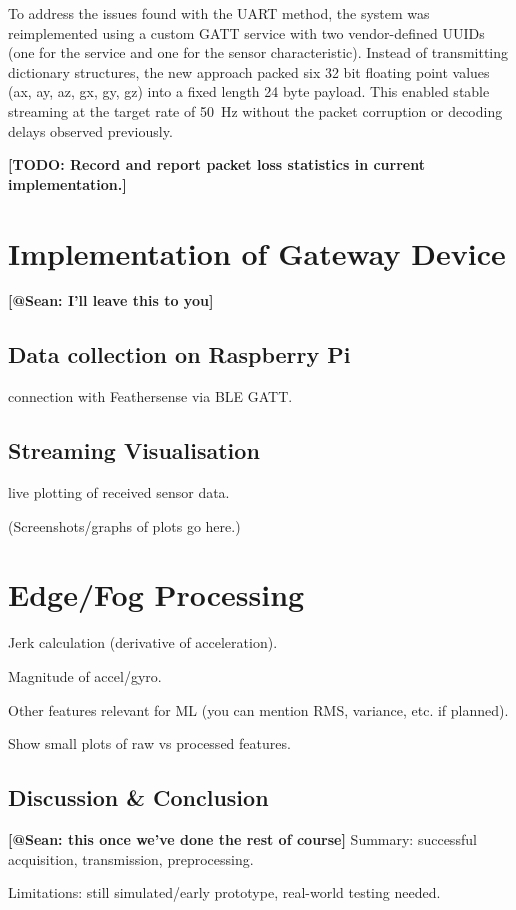 \documentclass[conference]{lib/IEEEtran}
\begin{document}
To address the issues found with the UART method, the system was reimplemented using a custom GATT service with two vendor-defined UUIDs (one for the service and one for the sensor characteristic). Instead of transmitting dictionary structures, the new approach packed six 32 bit floating point values (ax, ay, az, gx, gy, gz) into a fixed length 24 byte payload. This enabled stable streaming at the target rate of 50~Hz without the packet corruption or decoding delays observed previously.

\textbf{[TODO: Record and report packet loss statistics in current implementation.]} 




\section{Implementation of Gateway Device}
\textbf{[@Sean: I'll leave this to you]} 
\subsection{Data collection on Raspberry Pi}
connection with Feathersense via BLE GATT.

\subsection{Streaming Visualisation}
 live plotting of received sensor data.

(Screenshots/graphs of plots go here.)

\section{Edge/Fog Processing}
Jerk calculation (derivative of acceleration).

Magnitude of accel/gyro.

Other features relevant for ML (you can mention RMS, variance, etc. if planned).

Show small plots of raw vs processed features.


\subsection{Discussion \& Conclusion}
\textbf{[@Sean: this once we've done the rest of course]} 
Summary: successful acquisition, transmission, preprocessing.

Limitations: still simulated/early prototype, real-world testing needed.
\end{document}
